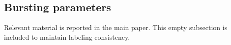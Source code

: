 \documentclass[aoas,preprint]{imsart}
\begin{document}
\clearpage


\subsection{Bursting parameters}

Relevant material is reported in the  main paper. This empty subsection is included to maintain labeling consistency.






\end{document}
